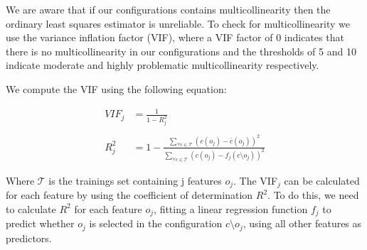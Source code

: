 We are aware that if our configurations contains multicollinearity then the ordinary least squares estimator is unreliable.
To check for multicollinearity we use the variance inflation factor (VIF), where a VIF factor of 0 indicates
that there is no multicollinearity in our configurations and the thresholds of 5 and 10 indicate moderate and highly problematic multicollinearity 
respectively. \cite{Multicollinearity}

We compute the VIF using the following equation:

\begin{align}
    VIF_{j} &= \frac{1}{1 - R^{2}_{j}}  \\ \nonumber\\
    R^{2}_{j} &= 1 - \frac{\sum\limits_{\forall c \in \mathcal{T}} (c(o_j) - \overline{c}(o_j))^2} {\sum\limits_{\forall c \in \mathcal{T}}(c(o_j) - f_j(c \setminus o_j))^2}
\end{align}

Where $\mathcal{T}$ is the trainings set containing j features $o_j$. The VIF$_{j}$ can be calculated for each feature by using the coefficient
of determination $R^2$. To do this, we need to calculate $R^2$ for each feature $o_j$, fitting a linear regression function $f_j$ to predict whether $o_j$
is selected in the configuration $c \setminus o_j$, using all other features as predictors. \cite{Multicollinearity}
